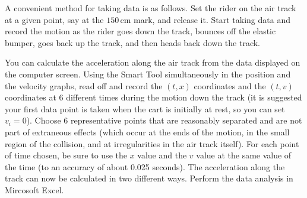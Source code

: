 A convenient method for taking data is as follows.  Set the rider on the air track at a given point, say at the $150\,\mathrm{cm}$ mark, and release it.  Start taking data and record the motion as the rider goes down the track, bounces off the elastic bumper, goes back up the track, and then heads back down the track. \myskip

You can calculate the acceleration along the air track from the data displayed on the computer screen.  Using the Smart Tool simultaneously in the position and the velocity graphs, read off and record the $(t,x)$ coordinates and the $(t,v)$ coordinates at 6 different times during the motion down the track (it is suggested your first data point is taken when the cart is initially at rest, so you can set $v_i = 0$).  Choose 6 representative points that are reasonably separated and are not part of extraneous effects (which occur at the ends of the motion, in the small region of the collision, and at irregularities in the air track itself).  For each point of time chosen, be sure to use the $x$ value and the $v$ value at the same value of the time (to an accuracy of about 0.025 seconds).  The acceleration along the track can now be calculated in two different ways. Perform the data analysis in Mircosoft Excel. \myskip
